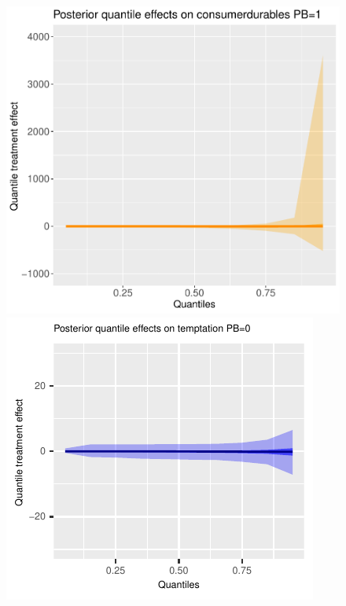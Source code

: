 \documentclass[AER]{AEA}
\begin{document}
\begin{figure}[h!]
    \includegraphics{posterior_parent_quantile_TEs_consumerdurables_pb_1_lognormal.pdf}\\
    \includegraphics{posterior_parent_quantile_TEs_temptation_pb_0_lognormal.pdf}

\end{figure}
\end{document}
